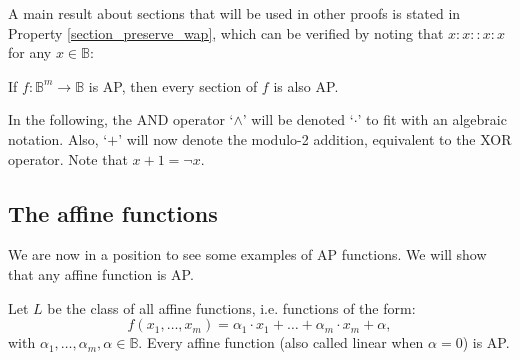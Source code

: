 A main result about sections that will be used in other proofs is stated in
Property \ref{section_preserve_wap}, which can be verified by noting that
$x:x::x:x$ for any $x \in \mathbb{B}$:

\begin{property}\label{section_preserve_wap}
If $f\colon \mathbb{B}^m\to \mathbb{B}$ is AP, then every section of $f$ is
also AP.  \end{property}

In the following, the AND operator `$\wedge$' will be denoted `$\cdot$' to fit
with an algebraic notation. Also, `$+$' will now denote the modulo-2 addition,
equivalent to the XOR operator. Note that $x + 1 = \neg x$.

\subsection{The affine functions}

We are now in a position to see some examples of AP functions. We will show that
any affine function is AP.

\begin{proposition}\label{affine_functions_are_wap}
Let $L$ be the class of all affine functions, i.e. functions of the form:
  $$f(x_1,\ldots , x_m)=\alpha_1\cdot x_1+\ldots +\alpha_m\cdot  x_m+\alpha,$$
  with $\alpha_1,\ldots, \alpha_m,\alpha\in \mathbb{B}$. Every affine function
  (also called linear when $\alpha = 0$) is AP.
\end{proposition}

